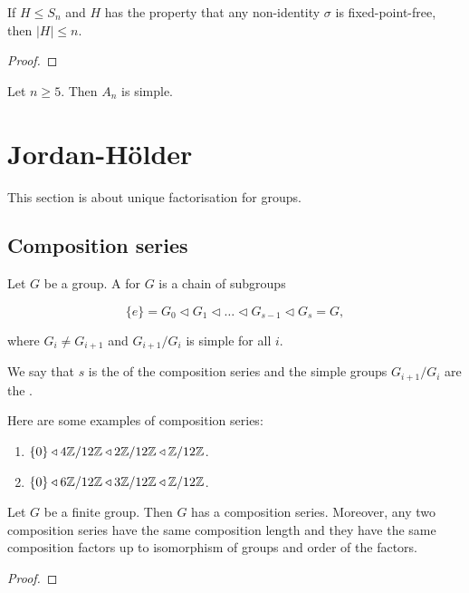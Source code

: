 \begin{lemma}
  If \(H \leq S_{n}\) and \(H\) has the property that any non-identity \(\sigma\) is fixed-point-free, then \(|H| \leq n\).
\end{lemma}

\begin{proof}
\end{proof}

\begin{theorem}
  Let \(n \geq 5\). Then \(A_{n}\) is simple.
\end{theorem}


\section{Jordan-H\"older}
This section is about unique factorisation for groups.

\subsection{Composition series}

\begin{definition}\label{def:group-theory:composition-series}
  Let \(G\) be a group. A  for \(G\) is a chain of subgroups

  \[\{e\} = G_{0} \triangleleft G_{1} \triangleleft \ldots \triangleleft G_{s-1} \triangleleft G_{s} = G,\]

  where \(G_{i} \neq G_{i+1}\) and \(G_{i+1}/G_{i}\) is simple for all \(i\).

  We say that \(s\) is the  of the composition series and the simple groups \(G_{i+1} / G_{i}\) are the .
\end{definition}

\begin{example}
  Here are some examples of composition series:

  \begin{enumerate}
  \item \(\{0\} \triangleleft 4 \mathbb{Z} / 12 \mathbb{Z} \triangleleft 2\mathbb{Z} / 12\mathbb{Z} \triangleleft \mathbb{Z}/12\mathbb{Z}\).
  \item \(\{0\} \triangleleft 6 \mathbb{Z} / 12 \mathbb{Z} \triangleleft 3\mathbb{Z} / 12\mathbb{Z} \triangleleft \mathbb{Z}/12\mathbb{Z}\).
  \end{enumerate}
\end{example}

\begin{theorem}\label{thm:group-theory:Jordan-Holder}
  Let \(G\) be a finite group. Then \(G\) has a composition series. Moreover, any two composition series have the same composition length and they have the same composition factors up to isomorphism of groups and order of the factors.
\end{theorem}
\begin{proof}
\end{proof}

